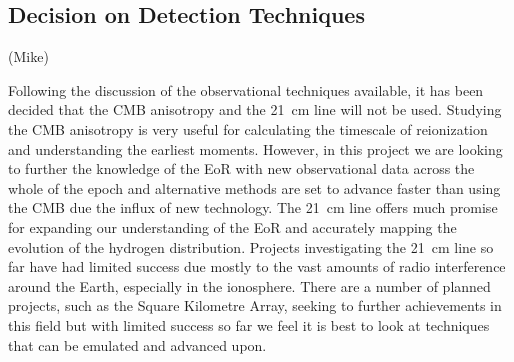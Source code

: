 
\subsection{Decision on Detection Techniques} %
\label{sec:decision_on_detection_techniques}
(Mike)

	Following the discussion of the observational techniques available, it has been decided that the CMB anisotropy and the \SI{21}{\centi\metre} line will not be used. Studying the CMB anisotropy is very useful for calculating the timescale of reionization and understanding the earliest moments. However, in this project we are looking to further the knowledge of the EoR with new observational data across the whole of the epoch and alternative methods are set to advance faster than using the CMB due the influx of new technology. The \SI{21}{\centi\metre} line offers much promise for expanding our understanding of the EoR and accurately mapping the evolution of the hydrogen distribution. Projects investigating the \SI{21}{\centi\metre} line so far have had limited success due mostly to the vast amounts of radio interference around the Earth, especially in the ionosphere. There are a number of planned projects, such as the Square Kilometre Array, seeking to further achievements in this field but with limited success so far we feel it is best to look at techniques that can be emulated and advanced upon.

